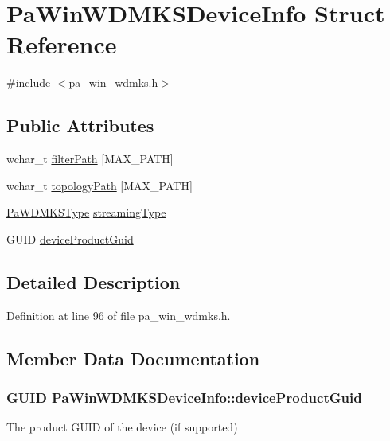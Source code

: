 \hypertarget{struct_pa_win_w_d_m_k_s_device_info}{}\section{Pa\+Win\+W\+D\+M\+K\+S\+Device\+Info Struct Reference}
\label{struct_pa_win_w_d_m_k_s_device_info}


{\ttfamily \#include $<$pa\+\_\+win\+\_\+wdmks.\+h$>$}

\subsection*{Public Attributes}
\begin{DoxyCompactItemize}
\item 
wchar\+\_\+t \hyperlink{struct_pa_win_w_d_m_k_s_device_info_aef789b50c6cf1e05c5c6e1e18e2a233c}{filter\+Path} \mbox{[}M\+A\+X\+\_\+\+P\+A\+TH\mbox{]}
\item 
wchar\+\_\+t \hyperlink{struct_pa_win_w_d_m_k_s_device_info_a89df08f196f4bc367794e7d76e404a04}{topology\+Path} \mbox{[}M\+A\+X\+\_\+\+P\+A\+TH\mbox{]}
\item 
\hyperlink{pa__win__wdmks_8h_ae95ef18411a817c541880a08fe5ca1f8}{Pa\+W\+D\+M\+K\+S\+Type} \hyperlink{struct_pa_win_w_d_m_k_s_device_info_a65b71d52a0990fdb97201d0cea3f05f1}{streaming\+Type}
\item 
G\+U\+ID \hyperlink{struct_pa_win_w_d_m_k_s_device_info_a183f5caf8ae9c7e62bcf6e19c8d2e4ad}{device\+Product\+Guid}
\end{DoxyCompactItemize}


\subsection{Detailed Description}


Definition at line 96 of file pa\+\_\+win\+\_\+wdmks.\+h.



\subsection{Member Data Documentation}
\subsubsection[{\texorpdfstring{device\+Product\+Guid}{deviceProductGuid}}]{\setlength{\rightskip}{0pt plus 5cm}G\+U\+ID Pa\+Win\+W\+D\+M\+K\+S\+Device\+Info\+::device\+Product\+Guid}\hypertarget{struct_pa_win_w_d_m_k_s_device_info_a183f5caf8ae9c7e62bcf6e19c8d2e4ad}{}\label{struct_pa_win_w_d_m_k_s_device_info_a183f5caf8ae9c7e62bcf6e19c8d2e4ad}
The product G\+U\+ID of the device (if supported) 

